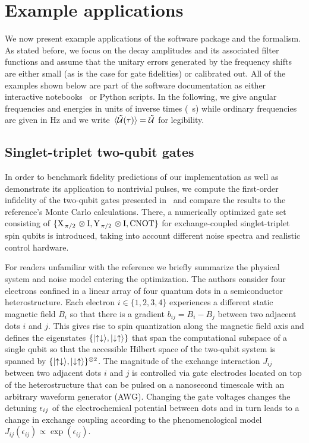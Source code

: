 \chapter{Example applications}\label{ch:ff:examples}
We now present example applications of the software package and the formalism.
As stated before, we focus on the decay amplitudes \decayamps and its associated filter functions and assume that the unitary errors generated by the frequency shifts \freqshifts are either small (as is the case for gate fidelities) or calibrated out.
All of the examples shown below are part of the software documentation as either interactive \jupyter notebooks~\cite{Kluyver2016} or Python scripts.
In the following, we give angular frequencies and energies in units of inverse times (\eg \si{\per\second}) while ordinary frequencies are given in \si{\hertz} and we write $\ev*{\liouvUe(\tau)} = \liouvUe$ for legibility.

\section{Singlet-triplet two-qubit gates}\label{sec:ff:examples:optimized_gates}
In order to benchmark fidelity predictions of our implementation as well as demonstrate its application to nontrivial pulses, we compute the first-order infidelity of the two-qubit gates presented in~ and compare the results to the reference's Monte Carlo calculations.
There, a numerically optimized gate set consisting of $\lbrace\mr{X}_{\flatfrac{\pi}{2}}\otimes\mr{I},\mr{Y}_{\flatfrac{\pi}{2}}\otimes\mr{I},\mr{CNOT}\rbrace$ for exchange-coupled singlet-triplet spin qubits is introduced, taking into account different noise spectra and realistic control hardware.

For readers unfamiliar with the reference we briefly summarize the physical system and noise model entering the optimization.
The authors consider four electrons confined in a linear array of four quantum dots in a semiconductor heterostructure.
Each electron $i\in\lbrace 1,2,3,4\rbrace$ experiences a different static magnetic field $B_i$ so that there is a gradient $b_{ij} = B_i - B_j$ between two adjacent dots $i$ and $j$.
This gives rise to spin quantization along the magnetic field axis and defines the eigenstates $\lbrace\mbox{\ensuremath{\ket{\uparrow\downarrow}}},\mbox{\ensuremath{\ket{\downarrow\uparrow}}}\rbrace$ that span the computational subspace of a single qubit so that the accessible Hilbert space of the two-qubit system is spanned by $\lbrace\mbox{\ensuremath{\ket{\uparrow\downarrow}}},\mbox{\ensuremath{\ket{\downarrow\uparrow}}}\rbrace^{\otimes 2}$.
The magnitude of the exchange interaction $J_{ij}$ between two adjacent dots $i$ and $j$ is controlled via gate electrodes located on top of the heterostructure that can be pulsed on a nanosecond timescale with an arbitrary waveform generator (AWG).
Changing the gate voltages changes the detuning $\epsilon_{ij}$ of the electrochemical potential between dots and in turn leads to a change in exchange coupling according to the phenomenological model $J_{ij}(\epsilon_{ij})\propto\exp(\epsilon_{ij})$.

